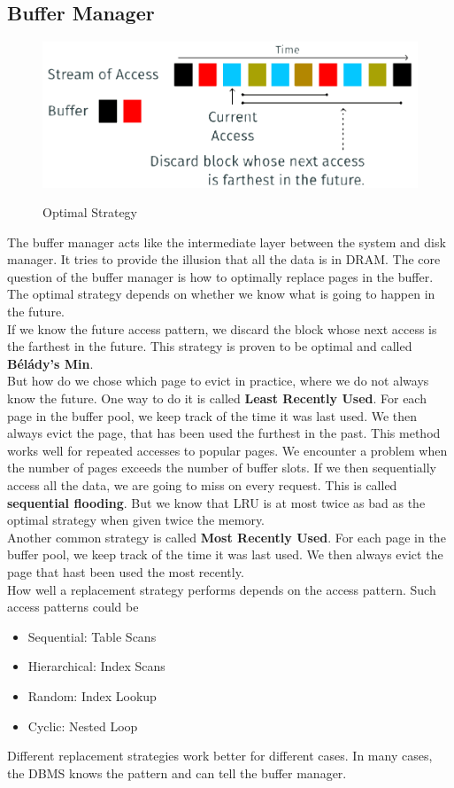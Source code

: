 \subsection{Buffer Manager}
\begin{figure}
\centering
\includegraphics[width=.5\textwidth]{images/belady.PNG}
\label{belady}
\caption{Optimal Strategy}
\end{figure}
The buffer manager acts like the intermediate layer between the system and disk manager. It tries to provide the illusion that all the data is in DRAM. The core question of the buffer manager is how to optimally replace pages in the buffer. The optimal strategy depends on whether we know what is going to happen in the future.
\vspace{.2cm}\\
If we know the future access pattern, we discard the block whose next access is the farthest in the future. This strategy is proven to be optimal and called \textbf{Bélády's Min}. \vspace{.2cm}\\
But how do we chose which page to evict in practice, where we do not always know the future. One way to do it is called \textbf{Least Recently Used}. For each page in the buffer pool, we keep track of the time it was last used. We then always evict the page, that has been used the furthest in the past. This method works well for repeated accesses to popular pages. We encounter a problem when the number of pages exceeds the number of buffer slots. If we then sequentially access all the data, we are going to miss on every request. This is called \textbf{sequential flooding}. But we know that LRU is at most twice as bad as the optimal strategy when given twice the memory. \vspace{.2cm}\\
Another common strategy is called \textbf{Most Recently Used}. For each page in the buffer pool, we keep track of the time it was last used. We then always evict the page that hast been used the most recently.\vspace{.2cm}\\
How well a replacement strategy performs depends on the access pattern. Such access patterns could be
\begin{itemize}
\item Sequential: Table Scans
\item Hierarchical: Index Scans
\item Random: Index Lookup
\item Cyclic: Nested Loop
\end{itemize}
Different replacement strategies work better for different cases. In many cases, the DBMS knows the pattern and can tell the buffer manager.

